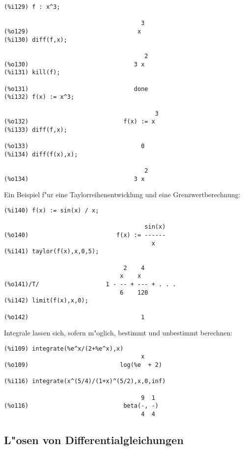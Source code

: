 \documentclass[spanish,12pt,a4paper]{article}
\begin{document}
\scriptsize
\begin{verbatim}
(%i129) f : x^3;

                                       3
(%o129)                               x
(%i130) diff(f,x);

                                        2
(%o130)                              3 x
(%i131) kill(f);

(%o131)                              done
(%i132) f(x) := x^3;

                                           3
(%o132)                           f(x) := x
(%i133) diff(f,x);

(%o133)                                0
(%i134) diff(f(x),x);

                                        2
(%o134)                              3 x
\end{verbatim}
\normalsize

Ein Beispiel f"ur eine Taylorreihenentwicklung und eine Grenzwertberechnung:

\scriptsize
\begin{verbatim}
(%i140) f(x) := sin(x) / x;

                                        sin(x)
(%o140)                         f(x) := ------
                                          x
(%i141) taylor(f(x),x,0,5);

                                  2    4
                                 x    x
(%o141)/T/                   1 - -- + --- + . . .
                                 6    120
(%i142) limit(f(x),x,0);

(%o142)                                1
\end{verbatim}
\normalsize

Integrale lassen sich, sofern m"oglich, bestimmt und unbestimmt berechnen:

\scriptsize
\begin{verbatim}
(%i109) integrate(%e^x/(2+%e^x),x)
                                       x
(%o109)                          log(%e  + 2)

(%i116) integrate(x^(5/4)/(1+x)^(5/2),x,0,inf)

                                       9  1
(%o116)                           beta(-, -)
                                       4  4
\end{verbatim}
\normalsize



\subsection{L"osen von Differentialgleichungen}
\end{document}
